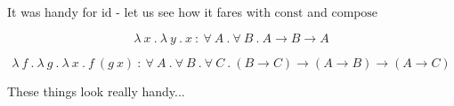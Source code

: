 \begin{frame}
  It was handy for ${\text{id}}$ - let us see how it fares with $\text{const}$
  and $\text{compose}$
\end{frame}

\begin{frame}
  \[
    \lambda~x~.~\lambda~y~.~x~{:}~\forall~A~.~\forall~B~.~A \rightarrow B \rightarrow A
  \]
\end{frame}

\begin{frame}
  \[
    \lambda~f~.~\lambda~g~.~\lambda~x~.~f~\left( g~x \right)~{:}~\forall~A~.~\forall~B~.~\forall~C~.~\left( B
      \rightarrow C \right) \rightarrow \left( A \rightarrow B \right)
    \rightarrow \left( A \rightarrow C \right)
  \]
\end{frame}

\begin{frame}
  These things look really handy...
\end{frame}